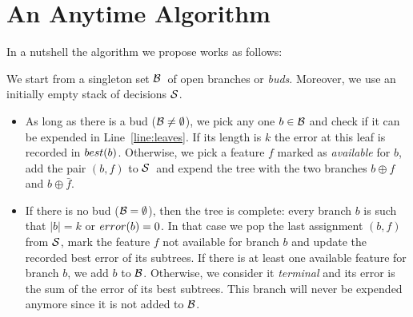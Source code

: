 \documentclass{llncs}
\newcommand{\nodes}[0]{\ensuremath{{\cal N}}}
\newcommand{\bud}[0]{\ensuremath{{\cal B}}}
\newcommand{\sequence}[0]{\ensuremath{{\cal S}}}
\newcommand{\maxd}[0]{\ensuremath{k}}
\newcommand{\afeat}[0]{\ensuremath{f}}
\newcommand{\best}[1][]{\ensuremath{\ifthenelse{\equal{#1}{}}{{best}}{{best({#1})}}}}
\newcommand{\error}[1][]{\ensuremath{\ifthenelse{\equal{#1}{}}{{error}}{{error({{#1}})}}}}
\newcommand{\abranch}[0]{\ensuremath{b}}
\newcommand{\mdepth}[0]{\ensuremath{k}}
\newcommand{\grow}[2]{\ensuremath{{#1}\oplus{#2}}}
\begin{document}
\section{An Anytime Algorithm}

In a nutshell the algorithm we propose works as follows:

\medskip

We start from a singleton set \bud\ of open branches or \emph{buds}.
Moreover, we use an initially empty stack of decisions $\sequence$.

\begin{itemize}
	\item As long as there is a bud ($\bud \neq \emptyset$), we pick any one $\abranch \in \bud$ and check if it can be expended in Line~\ref{line:leaves}. If its length is $\mdepth$ the error at this leaf is recorded in $\best[\abranch]$. Otherwise, we pick a feature $\afeat$ marked as \emph{available} for \abranch, add the pair $(\abranch,\afeat)$ to \sequence\ and expend the tree with the two branches $\grow{\abranch}{\afeat}$ and $\grow{\abranch}{\bar{\afeat}}$. 

\item If there is no bud ($\bud = \emptyset$), then the tree is complete: every branch $\abranch$ is such that $|\abranch| = \mdepth$ or $\error[\abranch]=0$. In that case we pop the last assignment $(\abranch,\afeat)$ from \sequence, mark the feature $\afeat$ not available for branch $\abranch$ and update the recorded best error of its subtrees. If there is at least one available feature for branch $\abranch$, we add $\abranch$ to $\bud$. 
Otherwise, we consider it \emph{terminal} and its error is the sum of the error of its best subtrees. This branch will never be expended anymore since it is not added to $\bud$.

\end{itemize}
\end{document}
